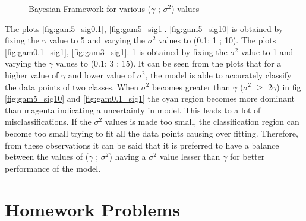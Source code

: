 {\begin{figure}[!htbp]
\begin{subfigure}{.33\textwidth}
		\label{fig:gam15_sig1}
	\end{subfigure}%
	\caption{Bayesian Framework for various ($\gamma$ ; $\sigma^2$) values}
	\label{fig:bayes}
\end{figure}
The plots \ref{fig:gam5_sig0.1}, \ref{fig:gam5_sig1}. \ref{fig:gam5_sig10} is obtained by fixing the $\gamma$ value to 5 and varying the $\sigma^2$ values to (0.1; 1 ; 10). The plots \ref{fig:gam0.1_sig1}, \ref{fig:gam3_sig1}. \ref{fig:gam15_sig1} is obtained by fixing the $\sigma^2$ value to 1 and varying the $\gamma$ values to (0.1; 3 ; 15). It can be seen from the plots that for a higher value of $\gamma$ and lower value of $\sigma^2$, the model is able to accurately classify the data points of two classes. When $\sigma^2$ becomes greater than $\gamma$ ($\sigma^2$ $\geq$ 2$\gamma$) in fig \ref{fig:gam5_sig10} and \ref{fig:gam0.1_sig1} the cyan region becomes more dominant than magenta indicating a uncertainty in model. This leads to a lot of misclassifications. If the $\sigma^2$ values is made too small, the classification region can become too small trying to fit all the data points causing over fitting. Therefore, from these observations it can be said that it is preferred to have a balance between the values of ($\gamma$ ; $\sigma^2$) having a $\sigma^2$ value lesser than $\gamma$ for better performance of the model.   
\section{Homework Problems}
}
